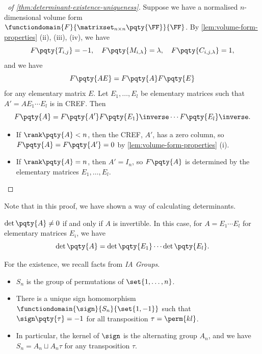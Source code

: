 \begin{proof}[\proofname\ of \autoref{thm:determinant-existence-uniqueness}]
     Suppose we have a normalised \(n\)-dimensional volume form \(\functiondomain{F}{\matrixset_{n \times n} \pqty{\FF}}{\FF}\). By \autoref{lem:volume-form-properties} (ii), (iii), (iv), we have
    \[
        F\pqty{T_{i, j}} = -1, \quad F\pqty{M_{i, \lambda}} = \lambda, \quad F\pqty{C_{i, j, \lambda}} = 1,
    \]
    and we have
    \[
        F\pqty{AE} = F\pqty{A} F\pqty{E}
    \]
    for any elementary matrix \(E\). Let \(E_1, \ldots, E_l\) be elementary matrices such that \(A' = A E_1 \cdots E_l\) is in CREF. Then
    \[
        F\pqty{A} = F\pqty{A'} F\pqty{E_1}\inverse \cdots F\pqty{E_l}\inverse.
    \]

    \begin{itemize}
        \item If \(\rank\pqty{A} < n\), then the CREF, \(A'\), has a zero column, so \(F\pqty{A} = F\pqty{A'} = 0\) by \autoref{lem:volume-form-properties} (i).
        \item If \(\rank\pqty{A} = n\), then \(A' = I_n\), so \(F\pqty{A}\) is determined by the elementary matrices \(E_1, \ldots, E_l\).
    \end{itemize}
\end{proof}

Note that in this proof, we have shown a way of calculating determinants.

\begin{corollary}
    \label{cor:determinant-calculation}%
    \(\det\pqty{A} \neq 0\) if and only if \(A\) is invertible. In this case, for \(A = E_1 \cdots E_l\) for elementary matrices \(E_i\), we have
    \[
        \det\pqty{A} = \det\pqty{E_1} \cdots \det\pqty{E_l}.
    \]
\end{corollary}

For the existence, we recall facts from \textit{IA Groups}.

\begin{itemize}
    \item \(S_n\) is the group of permutations of \(\set{1, \ldots, n}\).
    \item There is a unique sign homomorphism \(\functiondomain{\sign}{S_n}{\set{1, -1}}\) such that \(\sign\pqty{\tau} = -1\) for all transposition \(\tau = \perm{k l}\).
    \item In particular, the kernel of \(\sign\) is the alternating group \(A_n\), and we have \(S_n = A_n \sqcup A_n \tau\) for any transposition \(\tau\).
\end{itemize}

